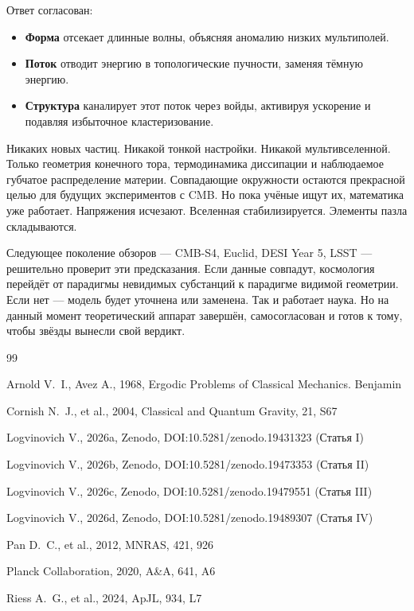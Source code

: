 \documentclass[12pt,a4paper]{report}
\begin{document}
Ответ согласован:
\begin{itemize}
    \item \textbf{Форма} отсекает длинные волны, объясняя аномалию низких мультиполей.
    \item \textbf{Поток} отводит энергию в топологические пучности, заменяя тёмную энергию.
    \item \textbf{Структура} каналирует этот поток через войды, активируя ускорение и подавляя избыточное кластеризование.
\end{itemize}

Никаких новых частиц. Никакой тонкой настройки. Никакой мультивселенной. Только геометрия конечного тора, термодинамика диссипации и наблюдаемое губчатое распределение материи. Совпадающие окружности остаются прекрасной целью для будущих экспериментов с CMB. Но пока учёные ищут их, математика уже работает. Напряжения исчезают. Вселенная стабилизируется. Элементы пазла складываются.

Следующее поколение обзоров — CMB-S4, Euclid, DESI Year 5, LSST — решительно проверит эти предсказания. Если данные совпадут, космология перейдёт от парадигмы невидимых субстанций к парадигме видимой геометрии. Если нет — модель будет уточнена или заменена. Так и работает наука. Но на данный момент теоретический аппарат завершён, самосогласован и готов к тому, чтобы звёзды вынесли свой вердикт.

\begin{thebibliography}{99}

Arnold V.~I., Avez A., 1968, Ergodic Problems of Classical Mechanics. Benjamin

Cornish N.~J., et al., 2004, Classical and Quantum Gravity, 21, S67

Logvinovich V., 2026a, Zenodo, DOI:10.5281/zenodo.19431323 (Статья I)

Logvinovich V., 2026b, Zenodo, DOI:10.5281/zenodo.19473353 (Статья II)

Logvinovich V., 2026c, Zenodo, DOI:10.5281/zenodo.19479551 (Статья III)

Logvinovich V., 2026d, Zenodo, DOI:10.5281/zenodo.19489307 (Статья IV)

Pan D.~C., et al., 2012, MNRAS, 421, 926

Planck Collaboration, 2020, A\&A, 641, A6

Riess A.~G., et al., 2024, ApJL, 934, L7

\end{thebibliography}
\end{document}

